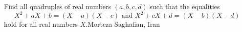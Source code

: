 Find all quadruples of real numbers $(a,b,c,d)$ such that the equalities\[X^2 + a X + b = (X-a)(X-c) \text{ and } X^2 + c X + d = (X-b)(X-d)\]hold for all real numbers $X$.Morteza Saghafian, Iran